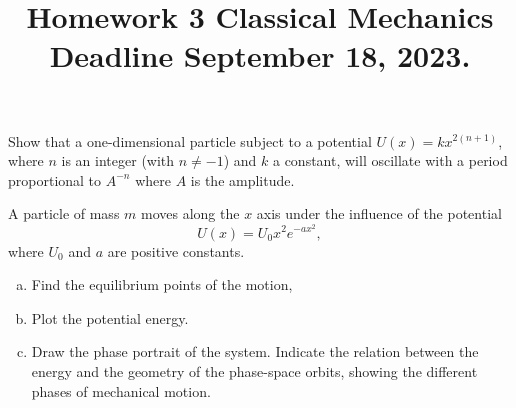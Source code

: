 \documentclass[12pt]{article}
\newenvironment{problem}[2][Problem]{\begin{trivlist}
\item[\hskip \labelsep {\bfseries #1}\hskip \labelsep {\bfseries #2.}]}{\end{trivlist}}
\begin{document}
 
 
\title{Homework 3 Classical Mechanics\\Deadline September 18, 2023.}
\date{}
 
\maketitle

\begin{problem}{1} 
Show that a one-dimensional particle subject to a potential $U(x) =k x^{2(n+1)}$, where $n$ is an integer (with $n\neq-1$) and $k$ a constant, will oscillate with a period proportional to $A^{-n}$ where $A$ is the amplitude.
\end{problem}

\begin{problem}{2}
A particle of mass $m$ moves along the $x$ axis under the influence of
the potential
\begin{equation}
U(x)=U_0 x^2 e^{-a x^2},
\end{equation}
where $U_0$ and $a$ are positive constants. 
\begin{enumerate} [(a)]
\item Find the equilibrium points of the motion, 
\item Plot the potential energy.
\item Draw the phase portrait of the system. Indicate the relation between the energy and the geometry of the phase-space
orbits, showing the different phases of mechanical motion.
\end{enumerate}
\end{problem}
\end{document}

